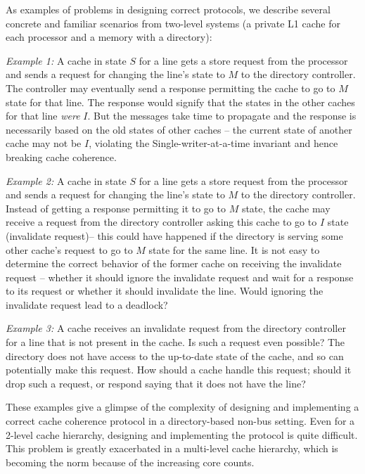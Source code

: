 As examples of problems in designing correct protocols, we describe several
concrete and familiar scenarios from two-level systems (a private L1 cache for
each processor and a memory with a directory):

\noindent \emph{Example 1:} A cache in state $S$ for a line gets a store request
from the processor and sends a request for changing the line's state to $M$ to
the directory controller. The controller may eventually send a response
permitting the cache to go to $M$ state for that line. The response would
signify that the states in the other caches for that line \emph{were} $I$. But
the messages take time to propagate and the response is necessarily based on the
old states of other caches -- the current state of another cache may not be $I$,
violating the Single-writer-at-a-time invariant and hence breaking cache
coherence.

\noindent \emph{Example 2:} A cache in state $S$ for a line gets a store request
from the processor and sends a request for changing the line's state to $M$ to
the directory controller. Instead of getting a response permitting it to go to
$M$ state, the cache may receive a request from the directory controller asking
this cache to go to $I$ state (invalidate request)-- this could have happened if
the directory is serving some other cache's request to go to $M$ state for the
same line. It is not easy to determine the correct behavior of the former cache
on receiving the invalidate request -- whether it should ignore the invalidate
request and wait for a response to its request or whether it should invalidate
the line. Would ignoring the invalidate request lead to a deadlock?

\noindent \emph{Example 3:} A cache receives an invalidate request from the
directory controller for a line that is not present in the cache. Is such a
request even possible? The directory does not have access to the up-to-date
state of the cache, and so can potentially make this request. How should a
cache handle this request; should it drop such a request, or respond saying
that it does not have the line?

These examples give a glimpse of the complexity of designing and implementing a
correct cache coherence protocol in a directory-based non-bus setting.  Even for
a 2-level cache hierarchy, designing and implementing the protocol is quite
difficult. This problem is greatly exacerbated in a multi-level cache hierarchy,
which is becoming the norm because of the increasing core counts. 

